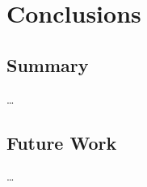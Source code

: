 
\chapter{Conclusions}
\label{ch:consclusions}

\section{Summary}
\label{sec:conclusions:summary}

\ldots
\par

\section{Future Work}
\label{sec:conclusions:future+work}

\ldots
\par

